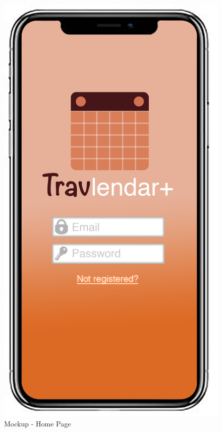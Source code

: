 \begin{figure}[H]
	\begin{minipage}{0.5\textwidth}
		\centerline{\includegraphics[width=0.3\paperwidth]{Images/Home}}
		\caption{Mockup - Home Page}
	\end{minipage}
	\begin{minipage}{0.5\textwidth}

\end{minipage}
\end{figure}
